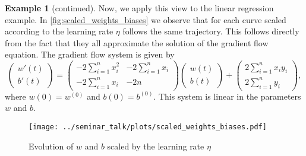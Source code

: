 \documentclass[12pt]{article}
\theoremstyle{definition}
\newtheorem{example}[theorem]{Example}
\numberwithin{equation}{section}
\begin{document}
\begin{example}[continued]
  Now, we apply this view to the linear regression example. In \autoref{fig:scaled_weights_biases} we observe that for each curve scaled according to the learning rate $\eta$ follows the same trajectory. This follows directly from the fact that they all approximate the solution of the gradient flow equation. The gradient flow system is given by
  \begin{equation*}
    \begin{pmatrix}
      w'(t)      \\
      b'(t)     
  \end{pmatrix}
  = 
  \begin{pmatrix}
    -2  \displaystyle\sum_{i=1}^n x_i^2  &  -2  \displaystyle\sum_{i=1}^n x_i      \\
      -2  \displaystyle\sum_{i=1}^n x_i  &  -2n      
  \end{pmatrix}
  \begin{pmatrix}
    w(t)     \\
    b(t)    
  \end{pmatrix}
  +
  \begin{pmatrix}
    2  \displaystyle\sum_{i=1}^n x_i y_i     \\
    2  \displaystyle\sum_{i=1}^n y_i    
  \end{pmatrix},
  \end{equation*}
  where $w(0) = w^{(0)}$ and $b(0) = b^{(0)}$. This system is linear in the parameters $w$ and $b$.
  \begin{figure}[htb]
    \centering
    \texttt{[image: ../seminar\_talk/plots/scaled\_weights\_biases.pdf]}
    \caption{Evolution of $w$ and $b$ scaled by the learning rate $\eta$}
    \label{fig:scaled_weights_biases}
  \end{figure}
\end{example}
\end{document}
